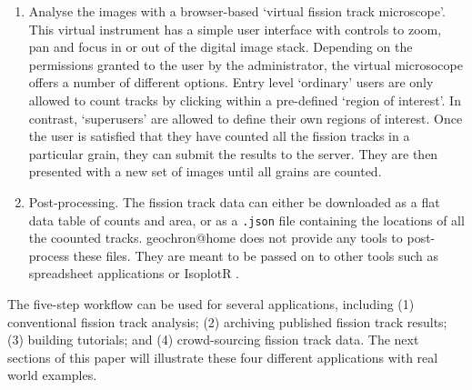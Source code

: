 \documentclass[gchron, manuscript]{copernicus}
\begin{document}
\begin{enumerate}
\item Analyse the images with a browser-based `virtual fission track
  microscope'. This virtual instrument has a simple user interface
  with controls to zoom, pan and focus in or out of the digital image
  stack. Depending on the permissions granted to the user by the
  administrator, the virtual microsocope offers a number of different
  options.  Entry level `ordinary' users are only allowed to count
  tracks by clicking within a pre-defined `region of interest'. In
  contrast, `superusers' are allowed to define their own regions of
  interest. Once the user is satisfied that they have counted all the
  fission tracks in a particular grain, they can submit the results to
  the server. They are then presented with a new set of images until
  all grains are counted.

\item Post-processing. The fission track data can either be downloaded
  as a flat data table of counts and area, or as a \texttt{.json} file
  containing the locations of all the coounted
  tracks. geochron@home does not provide any tools to
  post-process these files. They are meant to be passed on to other
  tools such as spreadsheet applications or IsoplotR
  \citep{vermeesch2018c}.
  
\end{enumerate}
  
The five-step workflow can be used for several applications, including
(1) conventional fission track analysis; (2) archiving published
fission track results; (3) building tutorials; and (4) crowd-sourcing
fission track data. The next sections of this paper will illustrate
these four different applications with real world examples.\medskip
\end{document}
